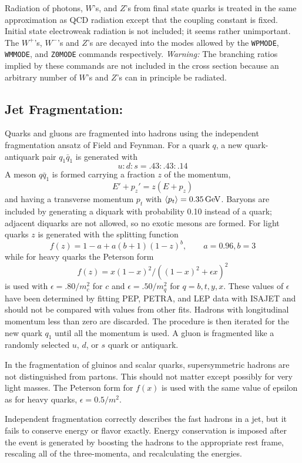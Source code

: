       Radiation of photons, $W$'s, and $Z$'s from final state quarks is
treated in the same approximation as QCD radiation except that the
coupling constant is fixed. Initial state electroweak radiation is not
included; it seems rather unimportant. The $W^+$'s, $W^-$'s and $Z$'s
are decayed into the modes allowed by the \verb|WPMODE|, \verb|WMMODE|,
and \verb|Z0MODE| commands respectively. {\it Warning:} The branching
ratios implied by these commands are not included in the cross section
because an arbitrary number of $W$'s and $Z$'s can in principle be
radiated.

\subsection{Jet Fragmentation:}

      Quarks and gluons are fragmented into hadrons using the
independent fragmentation ansatz of Field and Feynman. For a quark
$q$, a new quark-antiquark pair $q_1 \bar q_1$ is generated with
$$
u : d : s = .43 : .43 : .14
$$
A meson $q \bar q_1$ is formed carrying a fraction $z$ of the momentum,
$$
E' + p_z' = z (E + p_z)
$$
and having a transverse momentum $p_t$ with $\langle p_t \rangle =
0.35\,{\rm GeV}$. Baryons are included by generating a diquark with
probability 0.10 instead of a quark; adjacent diquarks are not
allowed, so no exotic mesons are formed. For light quarks $z$ is
generated with the splitting function
$$
f(z) = 1-a + a(b+1)(1-z)^b, \qquad
a = 0.96, b = 3
$$
while for heavy quarks the Peterson form
$$
f(z) = x (1-x)^2 / ( (1-x)^2 + \epsilon x )^2
$$
is used with $\epsilon = .80 / m_c^2$ for $c$ and $\epsilon = .50 /
m_q^2$ for $q = b, t, y, x$. These values of $\epsilon$ have been
determined by fitting PEP, PETRA, and LEP data with ISAJET and should
not be compared with values from other fits. Hadrons with longitudinal
momentum less than zero are discarded. The procedure is then iterated
for the new quark $q_1$ until all the momentum is used. A gluon is
fragmented like a randomly selected $u$, $d$, or $s$ quark or
antiquark. 

      In the fragmentation of gluinos and scalar quarks, supersymmetric
hadrons are not distinguished from partons. This should not matter
except possibly for very light masses. The Peterson form for $f(x)$ is
used with the same value of epsilon as for heavy quarks, $\epsilon =
0.5 / m^2$.

      Independent fragmentation correctly describes the fast hadrons in
a jet, but it fails to conserve energy or flavor exactly. Energy
conservation is imposed after the event is generated by boosting the
hadrons to the appropriate rest frame, rescaling all of the
three-momenta, and recalculating the energies.

